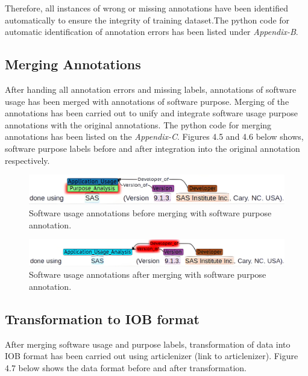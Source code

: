 Therefore, all instances of wrong or missing annotations have been identified automatically to ensure the integrity of training dataset.The python code for automatic identification of annotation errors has been listed under \emph{Appendix-B}.

\subsection{Merging Annotations}
\label{subsec:dataset:preprocessing:Merging}

After handing all annotation errors and missing labels, annotations of software usage has been merged with annotations of software purpose. Merging of the annotations has been carried out to unify and integrate software usage purpose annotations with the original annotations. The python code for merging annotations has been listed on the \emph{Appendix-C}. Figures 4.5 and 4.6 below shows, software purpose labels before and after integration into the original annotation respectively.  \\

\begin{figure}[htbp]
	\centering
	\includegraphics[width=.75\textwidth]{4.graphics/figures/ch_4/2002515_plm_unm_HD}
	\caption{Software usage annotations before merging with software purpose  annotation.}
	
	\label{fig:chapter04:setup}
\end{figure}

\begin{figure}[htbp]
	\centering
	\includegraphics[width=.75\textwidth]{4.graphics/figures/ch_4/2002515_plm_HD}
	\caption{Software usage annotations after merging with software purpose  annotation.}
	\label{fig:chapter04:setup}
\end{figure}


\subsection{Transformation to IOB format}
\label{subsec:dataset:preprocessing:Transformation}
After merging software usage and purpose labels, transformation of data into IOB format has been carried out using articlenizer (link to articlenizer). Figure 4.7 below shows the data format before and after transformation. \\

